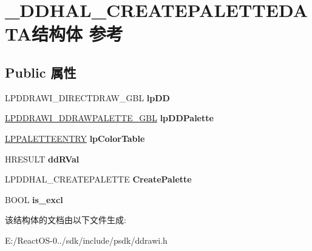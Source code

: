 \hypertarget{struct___d_d_h_a_l___c_r_e_a_t_e_p_a_l_e_t_t_e_d_a_t_a}{}\section{\+\_\+\+D\+D\+H\+A\+L\+\_\+\+C\+R\+E\+A\+T\+E\+P\+A\+L\+E\+T\+T\+E\+D\+A\+T\+A结构体 参考}
\label{struct___d_d_h_a_l___c_r_e_a_t_e_p_a_l_e_t_t_e_d_a_t_a}
\subsection*{Public 属性}
\begin{DoxyCompactItemize}
\item 
\mbox{\label{struct___d_d_h_a_l___c_r_e_a_t_e_p_a_l_e_t_t_e_d_a_t_a_a3d7eb71609184af80ad7268145280b02}} 
L\+P\+D\+D\+R\+A\+W\+I\+\_\+\+D\+I\+R\+E\+C\+T\+D\+R\+A\+W\+\_\+\+G\+BL {\bfseries lp\+DD}
\item 
\mbox{\label{struct___d_d_h_a_l___c_r_e_a_t_e_p_a_l_e_t_t_e_d_a_t_a_af1ad4fa82e3e833b939f7faa099cc88a}} 
\hyperlink{struct___d_d_r_a_w_i___d_d_r_a_w_p_a_l_e_t_t_e___g_b_l}{L\+P\+D\+D\+R\+A\+W\+I\+\_\+\+D\+D\+R\+A\+W\+P\+A\+L\+E\+T\+T\+E\+\_\+\+G\+BL} {\bfseries lp\+D\+D\+Palette}
\item 
\mbox{\label{struct___d_d_h_a_l___c_r_e_a_t_e_p_a_l_e_t_t_e_d_a_t_a_a615f0bf00441cc4e63ad2f2abaa30f6e}} 
\hyperlink{structtag_p_a_l_e_t_t_e_e_n_t_r_y}{L\+P\+P\+A\+L\+E\+T\+T\+E\+E\+N\+T\+RY} {\bfseries lp\+Color\+Table}
\item 
\mbox{\label{struct___d_d_h_a_l___c_r_e_a_t_e_p_a_l_e_t_t_e_d_a_t_a_ada29d172b1d38a2e882354de88edb619}} 
H\+R\+E\+S\+U\+LT {\bfseries dd\+R\+Val}
\item 
\mbox{\label{struct___d_d_h_a_l___c_r_e_a_t_e_p_a_l_e_t_t_e_d_a_t_a_a79545c691a7f51252b5ec406b1257e84}} 
L\+P\+D\+D\+H\+A\+L\+\_\+\+C\+R\+E\+A\+T\+E\+P\+A\+L\+E\+T\+TE {\bfseries Create\+Palette}
\item 
\mbox{\label{struct___d_d_h_a_l___c_r_e_a_t_e_p_a_l_e_t_t_e_d_a_t_a_a77baa8cbb916f054778ac5ea67f1b87d}} 
B\+O\+OL {\bfseries is\+\_\+excl}
\end{DoxyCompactItemize}


该结构体的文档由以下文件生成\+:\begin{DoxyCompactItemize}
\item 
E\+:/\+React\+O\+S-\/0../sdk/include/psdk/ddrawi.\+h\end{DoxyCompactItemize}
